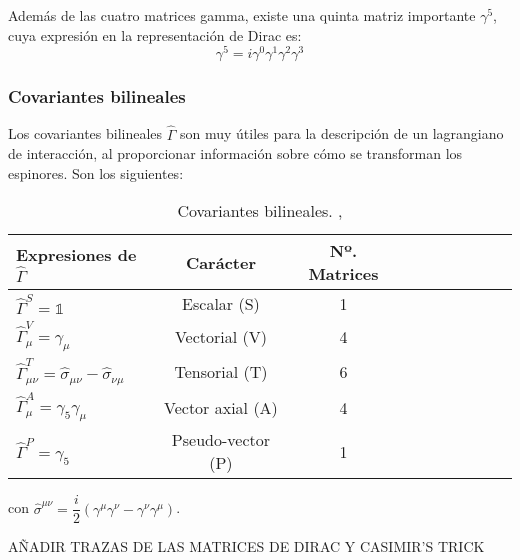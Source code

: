 Además de las cuatro matrices gamma, existe una quinta matriz importante $\gamma^5$, cuya expresión en la representación de Dirac es:
\begin{equation}
\gamma^5 = i \gamma^0 \gamma^1 \gamma^2 \gamma^3\label{eq:gamma5}
\end{equation}

\subsubsection{Covariantes bilineales}\label{sec:trazas}
Los covariantes bilineales $\widehat{\Gamma}$ son muy útiles para la descripción de un lagrangiano de interacción, al proporcionar información sobre cómo se transforman los espinores. Son los siguientes:

\begin{table}[h]
	\centering
	\begin{tabular}{l*{8}{c}r}
\hline
Expresiones de $\widehat{\Gamma}$  & Carácter & Nº. Matrices\\ 
\hline
$\widehat{\Gamma}^{S} = \mathbb{1}$ & Escalar (S) & 1\\
$\widehat{\Gamma}_{\mu}^{V} = \gamma_{\mu}$ & Vectorial (V) & 4 &\\
$\widehat{\Gamma}^{T}_{\mu\nu} = \hat{\sigma}_{\mu\nu}-\hat{\sigma}_{\nu\mu}$ & Tensorial (T) & 6\\
$\widehat{\Gamma}_{\mu}^{A} = \gamma_{5}\gamma_{\mu}$ & Vector axial (A) & 4\\
$\widehat{\Gamma}^{P} = \gamma_{5}$ & Pseudo-vector (P) & 1\\
\hline
	\end{tabular}
\caption[Covariantes bilineales]{Covariantes bilineales. \cite{MCR}, \cite{GreinerRQM}}
\label{tab:bilinear_covariant}
\end{table}

con $\hat{\sigma}^{\mu\nu}= \dfrac{i}{2} \left(\gamma^{\mu}\gamma^{\nu} - \gamma^{\nu}\gamma^{\mu} \right)$.


AÑADIR TRAZAS DE LAS MATRICES DE DIRAC Y  CASIMIR'S TRICK
